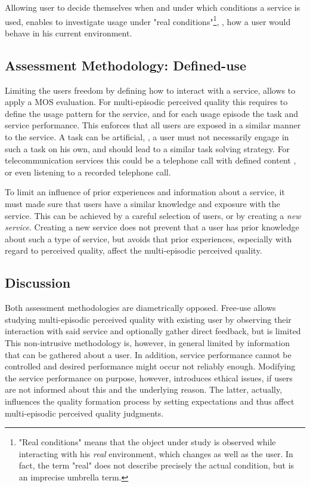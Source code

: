 Allowing user to decide themselves when and under which conditions a service is used, enables to investigate usage under "real conditions"\footnote{"Real conditions" means that the object under study is observed while interacting with his \emph{real} environment, which changes as well as the user. In fact, the term "real" does not describe precisely the actual condition, but is an imprecise umbrella term.}, \ie, how a user would behave in his current environment.

\subsection{Assessment Methodology: Defined-use}
Limiting the users freedom by defining how to interact with a service, allows to apply a \ac{MOS} evaluation.
For multi-episodic perceived quality this requires to define the usage pattern for the service, and for each usage episode the task and service performance.
This enforces that all users are exposed in a similar manner to the service.
A task can be artificial, \ie, a user must not necessarily engage in such a task on his own, and should lead to a similar task solving strategy.
For telecommunication services this could be a telephone call with defined content \citep[cf.][]{itu-t_p.805:_2007}, or even listening to a recorded telephone call.

To limit an influence of prior experiences and information about a service, it must made sure that users have a similar knowledge and exposure with the service.
This can be achieved by a careful selection of users, or by creating a \emph{new service}.
Creating a new service does not prevent that a user has prior knowledge about such a type of service, but avoids that prior experiences, especially with regard to perceived quality, affect the multi-episodic perceived quality.

\subsection{Discussion}
Both assessment methodologies are diametrically opposed. Free-use allows studying multi-episodic perceived quality with existing user by observing their interaction with said service and optionally gather direct feedback, but is limited This non-intrusive methodology is, however, in general limited by information that can be gathered about a user.
In addition, service performance cannot be controlled and desired performance might occur not reliably enough.
Modifying the service performance on purpose, however, introduces ethical issues, if users are not informed about this and the underlying reason.
The latter, actually, influences the quality formation process by setting expectations and thus affect multi-episodic perceived quality judgments.


